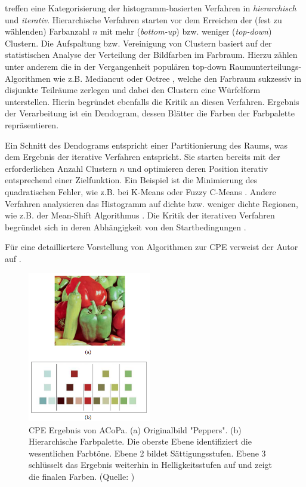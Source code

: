 \citet{categorization} treffen eine Kategorisierung der histogramm-basierten Verfahren in \emph{hierarchisch} und \emph{iterativ}. Hierarchische Verfahren starten vor dem Erreichen der (fest zu wählenden) Farbanzahl $n$ mit mehr (\emph{bottom-up}) bzw. weniger (\emph{top-down}) Clustern. Die Aufspaltung bzw. Vereinigung von Clustern basiert auf der statistischen Analyse der Verteilung der Bildfarben im Farbraum. Hierzu zählen unter anderem die in der Vergangenheit populären top-down Raumunterteilungs-Algorithmen wie z.B. Mediancut \citep{mediancut} oder Octree \citep{octree}, welche den Farbraum sukzessiv in disjunkte Teilräume zerlegen und dabei den Clustern eine Würfelform unterstellen. Hierin begründet ebenfalls die Kritik an diesen Verfahren. Ergebnis der Verarbeitung ist ein Dendogram, dessen Blätter die Farben der Farbpalette repräsentieren.

Ein Schnitt des Dendograms entspricht einer Partitionierung des Raums, was dem Ergebnis der iterative Verfahren entspricht.  Sie starten bereits mit der erforderlichen Anzahl Clustern $n$ und optimieren deren Position iterativ entsprechend einer Zielfunktion. Ein Beispiel ist die Minimierung des quadratischen Fehler, wie z.B. bei K-Means \citep{kmeans, kmeanshsi} oder Fuzzy C-Means \citep{fuccycmeans}. Andere Verfahren analysieren das Histogramm auf dichte bzw. weniger dichte Regionen, wie z.B. der Mean-Shift Algorithmus \citep{meanshift}. Die Kritik der iterativen Verfahren begründet sich in deren Abhängigkeit von den Startbedingungen \citep{acopa}.

Für eine detailliertere Vorstellung von Algorithmen zur CPE verweist der Autor auf \citet{categorization2}.

\begin{figure}[h]
\centering
\includegraphics[width=0.48\textwidth]{img/peppers.png}
\caption{CPE Ergebnis von ACoPa. (a) Originalbild "Peppers". (b) Hierarchische Farbpalette. Die oberste Ebene identifiziert die wesentlichen Farbtöne. Ebene 2 bildet Sättigungsstufen. Ebene 3 schlüsselt das Ergebnis weiterhin in Helligkeitsstufen auf und zeigt die finalen Farben. (Quelle: \citep{acopa})}
\label{fig:peppers}
\end{figure}

